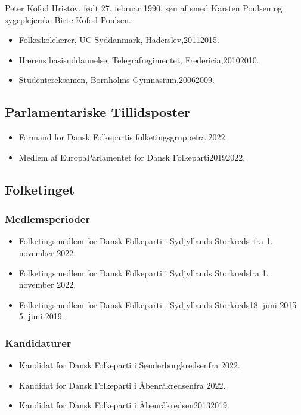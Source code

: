 \documentclass[11pt, a4paper]{awesome-cv}
\begin{document}
\makecvheader[R]
\makelettertitle
\begin{cvletter}
Peter Kofod Hristov, født 27. februar 1990, søn af smed Karsten Poulsen og sygeplejerske Birte Kofod Poulsen.

\begin{itemize}
\item Folkeskolelærer, UC Syddanmark, Haderslev,20112015.
\item Hærens basisuddannelse, Telegrafregimentet, Fredericia,20102010.
\item Studentereksamen, Bornholms Gymnasium,20062009.
\end{itemize}
\subsection*{Parlamentariske Tillidsposter}
\begin{itemize}
\item Formand for Dansk Folkepartis folketingsgruppefra 2022.
\item Medlem af EuropaParlamentet for Dansk Folkeparti20192022.
\end{itemize}
\subsection*{Folketinget}
\subsubsection*{Medlemsperioder}
\begin{itemize}
\item Folketingsmedlem for Dansk Folkeparti i Sydjyllands Storkreds fra 1. november 2022.
\item Folketingsmedlem for Dansk Folkeparti i Sydjyllands Storkredsfra 1. november 2022.
\item Folketingsmedlem for Dansk Folkeparti i Sydjyllands Storkreds18. juni 2015  5. juni 2019.
\end{itemize}
\subsubsection*{Kandidaturer}
\begin{itemize}
\item Kandidat for Dansk Folkeparti i Sønderborgkredsenfra 2022.
\item Kandidat for Dansk Folkeparti i Åbenråkredsenfra 2022.
\item Kandidat for Dansk Folkeparti i Åbenråkredsen20132019.
\end{itemize}
\end{cvletter}
\end{document}
